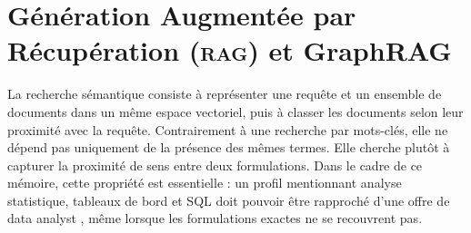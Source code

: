 \documentclass[12pt,twoside]{report}
\newcommand{\RAG}{\textsc{rag}}
\begin{document}




\section{Génération Augmentée par Récupération (\RAG{}) et GraphRAG}

La recherche sémantique consiste à représenter une requête et un ensemble de documents dans un même espace vectoriel, puis à classer les documents selon leur proximité avec la requête. Contrairement à une recherche par mots-clés, elle ne dépend pas uniquement de la présence des mêmes termes. Elle cherche plutôt à capturer la proximité de sens entre deux formulations. Dans le cadre de ce mémoire, cette propriété est essentielle : un profil mentionnant \og analyse statistique, tableaux de bord et SQL \fg{} doit pouvoir être rapproché d'une offre de \og data analyst \fg{}, même lorsque les formulations exactes ne se recouvrent pas.
\end{document}
